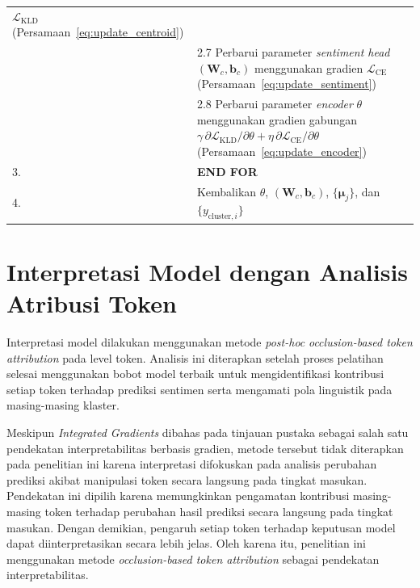 \begin{table}[H]
\begin{tabular}{p{} p{}}
     $\mathcal{L}_{\text{KLD}}$ (Persamaan~\ref{eq:update_centroid}) \\[3pt]
   & \hspace{1em} 2.7 \hspace{0.5em}
     Perbarui parameter \textit{sentiment head} $(\mathbf{W}_c, \mathbf{b}_c)$
     menggunakan gradien $\mathcal{L}_{\text{CE}}$
     (Persamaan~\ref{eq:update_sentiment}) \\[3pt]
   & \hspace{1em} 2.8 \hspace{0.5em}
     Perbarui parameter \textit{encoder} $\theta$ menggunakan gradien
     gabungan $\gamma \, \partial \mathcal{L}_{\text{KLD}} / \partial\theta +
     \eta \, \partial \mathcal{L}_{\text{CE}} / \partial\theta$
     (Persamaan~\ref{eq:update_encoder}) \\[3pt]
3. & \textbf{END FOR} \\[3pt]
4. & Kembalikan $\theta$, $(\mathbf{W}_c, \mathbf{b}_c)$,
     $\{\boldsymbol{\mu}_j\}$, dan $\{y_{\text{cluster},i}\}$ \\
\hline
\end{tabular}
\end{table}


\section{Interpretasi Model dengan Analisis Atribusi Token}
\label{sec:atribusi}

Interpretasi model dilakukan menggunakan metode \textit{post-hoc}
\textit{occlusion-based token attribution} pada level token. Analisis ini
diterapkan setelah proses pelatihan selesai menggunakan bobot model terbaik
untuk mengidentifikasi kontribusi setiap token terhadap prediksi sentimen
serta mengamati pola linguistik pada masing-masing klaster.

Meskipun \textit{Integrated Gradients} dibahas pada tinjauan pustaka sebagai
salah satu pendekatan interpretabilitas berbasis gradien, metode tersebut tidak
diterapkan pada penelitian ini karena interpretasi difokuskan pada analisis
perubahan prediksi akibat manipulasi token secara langsung pada tingkat masukan.
Pendekatan ini dipilih karena memungkinkan pengamatan kontribusi
masing-masing token terhadap perubahan hasil prediksi secara langsung
pada tingkat masukan. Dengan demikian, pengaruh setiap token terhadap
keputusan model dapat diinterpretasikan secara lebih jelas. Oleh karena
itu, penelitian ini menggunakan metode
\textit{occlusion-based token attribution} sebagai pendekatan
interpretabilitas.

